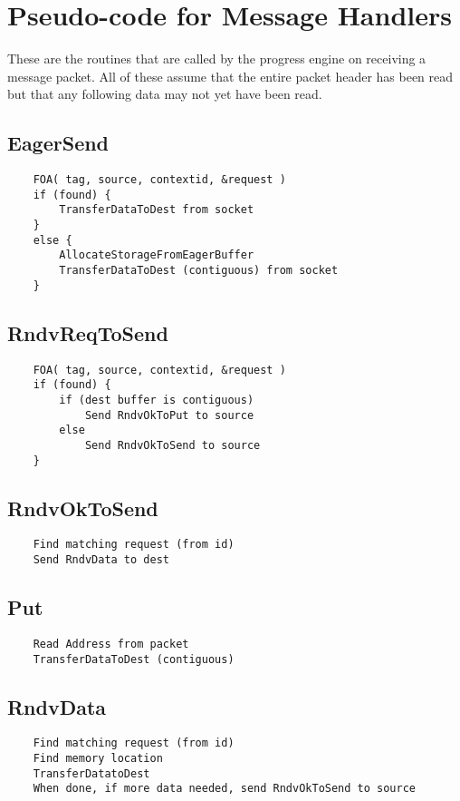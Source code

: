 \documentclass{article}
\begin{document}
\section{Pseudo-code for Message Handlers}
These are the routines that are called by the progress engine on receiving a
message packet.  All of these assume that the entire packet header has been 
read but that any following data may not yet have been read.

\subsection{EagerSend}
\begin{verbatim}
    FOA( tag, source, contextid, &request )
    if (found) {
        TransferDataToDest from socket
    }
    else {
        AllocateStorageFromEagerBuffer
        TransferDataToDest (contiguous) from socket
    }
\end{verbatim}

\subsection{RndvReqToSend}
\begin{verbatim}
    FOA( tag, source, contextid, &request )
    if (found) {
        if (dest buffer is contiguous)
            Send RndvOkToPut to source
        else
            Send RndvOkToSend to source
    }
\end{verbatim}

\subsection{RndvOkToSend}
\begin{verbatim}
    Find matching request (from id)
    Send RndvData to dest
\end{verbatim}

\subsection{Put}
\begin{verbatim}
    Read Address from packet
    TransferDataToDest (contiguous)
\end{verbatim}

\subsection{RndvData}
\begin{verbatim}
    Find matching request (from id)
    Find memory location
    TransferDatatoDest
    When done, if more data needed, send RndvOkToSend to source
\end{verbatim}
\end{document}
